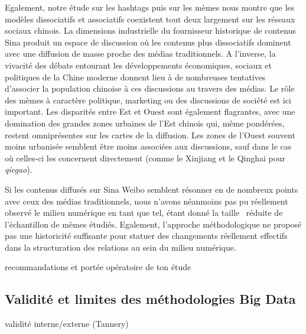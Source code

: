 Egalement, notre étude sur les hashtags puis sur les mèmes nous montre que les modèles dissociatifs et associatifs coexistent tout deux largement sur les réseaux sociaux chinois. La dimensions industrielle du fournisseur historique de contenus Sina produit un espace de discussion o\`u les contenus plus dissociatifs dominent avec une diffusion de masse proche des médias traditionnels. A l{\textquoteright}inverse, la vivacité des débats entourant les développements économiques, sociaux et politiques de la Chine moderne donnent lieu à de nombreuses tentatives d{\textquoteright}associer la population chinoise à ces discussions au travers des médias. Le r\^ole des mèmes à caractère politique, marketing ou des discussions de société est ici important. Les disparités entre Est et Ouest sont également flagrantes, avec une domination des grandes zones urbaines de l{\textquoteright}Est chinois qui, m\^eme pondérées, restent omniprésentes sur les cartes de la diffusion. Les zones de l{\textquoteright}Ouest souvent moins urbanisée semblent \^etre moins associées aux discussions, sauf dans le cas o\`u celles-ci les concernent directement (comme le Xinjiang et le Qinghai pour \textit{qiegao}).

Si les contenus diffusés sur Sina Weibo semblent résonner en de nombreux points avec ceux des médias traditionnels, nous n{\textquoteright}avons néanmoins pas pu réellement observé le milieu numérique en tant que tel, étant donné la taille \ réduite de l{\textquoteright}échantillon de mèmes étudiés. Egalement, l{\textquoteright}approche méthodologique ne proposé pas une historicité suffisante pour statuer des changements réellement effectifs dans la structuration des relations au sein du milieu numérique.
 

recommandations et portée opératoire de ton étude


\subsection[Validité et limites des méthodologies Big Data]{Validité et limites des méthodologies Big Data}


validité interne/externe (Tannery)


% 
% 
% 

